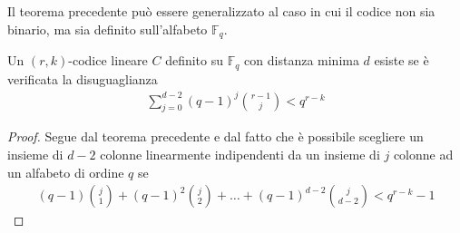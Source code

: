 Il teorema precedente può essere generalizzato al caso in cui il codice non sia binario, ma sia definito sull'alfabeto $\mathbb{F}_{q}$.
\begin{corollario}
   Un $(r,k)$-codice lineare $C$ definito su $\mathbb{F}_{q}$ con distanza minima $d$ esiste se è verificata la disuguaglianza
   \begin{align*}
      \sum_{j=0}^{d-2} (q-1)^{j} \binom{r-1}{j} < q^{r-k}
   \end{align*}
\end{corollario}
\begin{proof}
   Segue dal teorema precedente e dal fatto che è possibile scegliere un insieme di $d-2$ colonne linearmente indipendenti da un insieme di $j$ colonne ad un alfabeto di ordine $q$ se 
   \begin{align*}
      (q-1)\binom{j}{1} + (q-1)^{2} \binom{j}{2}+ \dots + (q-1)^{d-2} \binom{j}{d-2}
      <
      q^{r-k} - 1
   \end{align*}
\end{proof}



